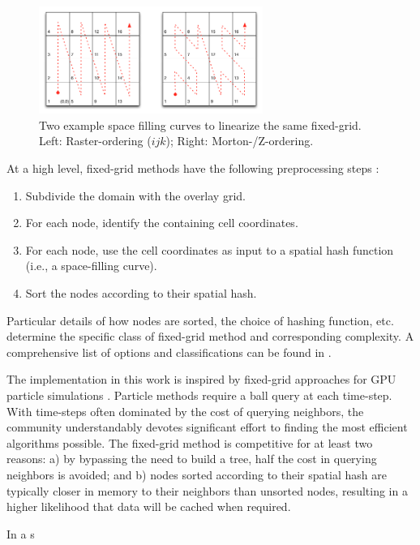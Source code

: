 \documentclass{report}
\begin{document}
\begin{figure}
\centering
\includegraphics[width=0.65\textwidth]{rbffd_methods_content/neighbors/space_filling_curves.png}
\caption{Two example space filling curves to linearize the same fixed-grid. Left: Raster-ordering ($ijk$); Right: Morton-/Z-ordering.}
\label{fig:space_filling_curves}
\end{figure} 


At a high level, fixed-grid methods have the following preprocessing steps \cite{Krog2010}:
\begin{enumerate}
\item Subdivide the domain with the overlay grid.
\item For each node, identify the containing cell coordinates.
\item For each node, use the cell coordinates as input to a spatial hash function (i.e., a space-filling curve).
\item Sort the nodes according to their spatial hash.
\end{enumerate}
Particular details of how nodes are sorted, the choice of hashing function, etc. determine the specific class of fixed-grid method and corresponding complexity. A comprehensive list of options and classifications can be found in \cite{Samet2005}. 

The implementation in this work is inspired by fixed-grid approaches for GPU particle simulations \cite{Krog2010,Green2010,Johnson2011}. Particle methods require a ball query at each time-step. With time-steps often dominated by the cost of querying neighbors, the community understandably devotes significant effort to finding the most efficient algorithms possible. The fixed-grid method is competitive for at least two reasons: a) by bypassing the need to build a tree, half the cost in querying neighbors is avoided; and b) nodes sorted according to their spatial hash are typically closer in memory to their neighbors than unsorted nodes, resulting in a higher likelihood that data will be cached when required. 

In \cite{Krog2010} a s
\end{document}
